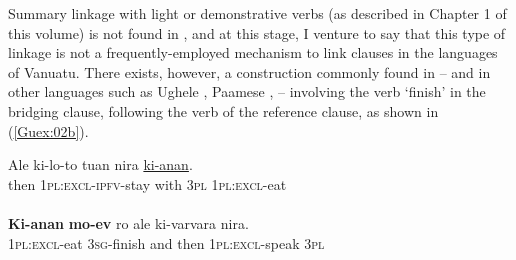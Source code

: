 \documentclass[output=paper]{LSP/langsci}
\begin{document}
Summary linkage with light or demonstrative verbs (as described in Chapter 1 of this volume) is not found in , and at this stage, I venture to say that this type of linkage is not a frequently-employed mechanism to link clauses in the  languages of Vanuatu. There exists, however, a construction commonly found in  -- and in other  languages such as Ughele \citep{Frostad2012}, Paamese \citep[][39]{crowley03},  \citep{hyslop01} -- involving the verb `finish' in the bridging clause, following the verb of the reference clause, as shown in (\ref{Guex:02b}).

\begin{exe}
\ex \label{Guex:02ab}
\begin{xlist}
\ex \label{Guex:02a}
\gll Ale    ki-lo-to       tuan   nira \underline{ki-anan}.\\
then  \textsc{1pl:excl-ipfv}-stay   with   \textsc{3pl}  \textsc{1pl:excl}-eat\\
\glt {}\\
\ex \label{Guex:02b}
\gll \textbf{Ki-anan}           \textbf{mo-ev} ro      ale  ki-varvara           nira.\\     	       
    \textsc{1pl:excl}-eat    \textsc{3sg}-finish   and   then  \textsc{1pl:excl-}speak     \textsc{3pl}\\
\glt {} 
\end{xlist}
\end{exe}
\end{document}
